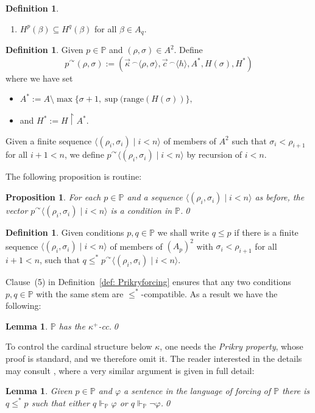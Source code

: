 \documentclass[11pt]{amsart}
\newtheorem{lemma}[theorem]{Lemma}
\newtheorem{proposition}[theorem]{Proposition}
\theoremstyle{definition}
\newtheorem{definition}[theorem]{Definition}
\theoremstyle{remark}
\newcommand\cat[1]{{}^\curvearrowright #1}
\def\s{\subseteq}
\def\forces{\Vdash}
\begin{document}
\begin{definition}
\begin{enumerate}
        \item $H^p(\beta)\s H^q(\beta)$ for all $\beta\in A_q$.
    \end{enumerate}
\end{definition}



\begin{definition}
    Given $p\in \mathbb{P}$  and $(\rho,\sigma)\in A^2$. Define
    $$p\cat (\rho, \sigma):=(\vec{\kappa}\,{}^\smallfrown \langle \rho,\sigma\rangle, \vec{c}\,{}^\smallfrown\langle h\rangle, A^*, H(\sigma), H^*)$$
     where we have set 
 \begin{itemize}
     \item $A^*:=A\setminus \max\{\sigma+1,\sup(\mathrm{range}(H(\sigma))\},$
     \item and $H^*:=H\restriction A^*$.
 \end{itemize}
 Given a finite sequence $\langle (\rho_i,\sigma_i)\mid i<n\rangle$ of members of $A^2$ such that  $\sigma_i<\rho_{i+1}$ for all $i+1<n$, we define $p\cat \langle (\rho_i,\sigma_i)\mid i<n\rangle$ by recursion of $i<n$.
 \end{definition}

 The following proposition is routine:
 \begin{proposition}
    For each $p\in \mathbb{P}$ and a sequence $\langle (\rho_i,\sigma_i)\mid i<n\rangle$  as before, the vector $p\cat \langle (\rho_i,\sigma_i)\mid i<n\rangle$ is a condition in $\mathbb{P}$.\qed
 \end{proposition}
 \begin{definition}
     Given conditions $p,q\in \mathbb{P}$ we shall write $q\leq p$ if there is a finite sequence $\langle (\rho_i,\sigma_i)\mid i<n\rangle$ of members of $(A_p)^2$ with  $\sigma_i<\rho_{i+1}$ for all $i+1<n$, such that $q\leq^* p\cat \langle (\rho_i,\sigma_i)\mid i<n\rangle$.
 \end{definition}
  Clause~(5) in Definition~\ref{def: Prikryforcing} ensures that any two conditions $p,q\in \mathbb{P}$ with the same stem are $\leq^*$-compatible. As a result we have the following:
\begin{lemma}
   $\mathbb{P}$ has the $\kappa^{+}$-cc.\qed
\end{lemma}

To control the cardinal structure below $\kappa$, one needs the \emph{Prikry property}, whose proof is standard, and we therefore omit it. The reader interested in the details may consult \cite[Lemma~4.11]{NonGalvinFil}, where a very similar argument is given in full detail:
\begin{lemma}
Given  $p\in \mathbb{P}$ and $\varphi$ a sentence in the language of forcing of $\mathbb{P}$ there is $q\leq^* p$ such that either $q\forces_{\mathbb{P}}\varphi$ or $q\forces_{\mathbb{P}}\neg \varphi$.\qed
\end{lemma}
\end{document}
